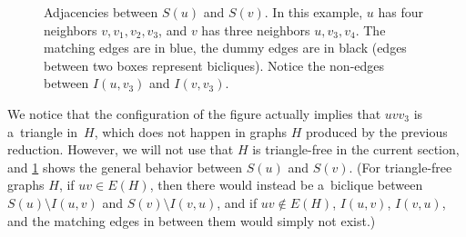 \documentclass[a4paper,UKenglish,cleveref,hyperref,autoref]{lipics-v2021}
\begin{document}
\begin{figure}[h!]
  \centering
  \caption{Adjacencies between $S(u)$ and $S(v)$.
    In this example, $u$ has four neighbors $v, v_1, v_2, v_3$, and $v$ has three neighbors $u, v_3, v_4$.
    The matching edges are in blue, the dummy edges are in black (edges between two boxes represent bicliques).
    Notice the non-edges between $I(u,v_3)$ and $I(v,v_3)$.}
  \label{fig:matching-and-dummy}
\end{figure}

We notice that the configuration of the figure actually implies that $uvv_3$ is a~triangle in~$H$, which does not happen in graphs $H$ produced by the previous reduction.
However, we will not use that $H$ is triangle-free in the current section, and \cref{fig:matching-and-dummy} shows the general behavior between $S(u)$ and $S(v)$.
(For triangle-free graphs $H$, if $uv \in E(H)$, then there would instead be a~biclique between $S(u) \setminus I(u,v)$ and $S(v) \setminus I(v,u)$, and if $uv \notin E(H)$, $I(u,v)$, $I(v,u)$, and the matching edges in between them would simply not exist.) 
\end{document}
